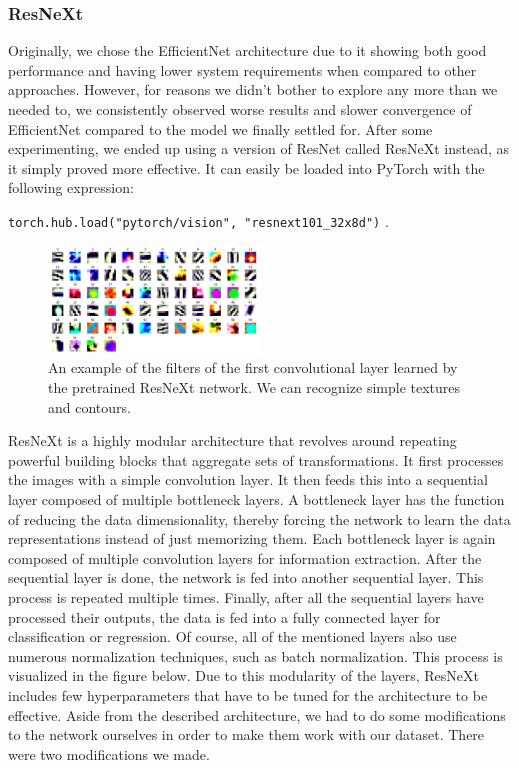 \documentclass[]{article}
\let\oldtexttt\texttt
\renewcommand{\texttt}[1]{
  \textcolor{tcolor}{\colorbox{bgcolor}{\oldtexttt{#1}}}
}
\begin{document}
\hypertarget{resnext}{%
\subsubsection{ResNeXt}\label{resnext}}

Originally, we chose the EfficientNet architecture due to it showing
both good performance and having lower system requirements when compared
to other approaches. However, for reasons we didn't bother to explore
any more than we needed to, we consistently observed worse results and
slower convergence of EfficientNet compared to the model we finally
settled for. After some experimenting, we ended up using a version of
ResNet called ResNeXt instead, as it simply proved more effective. It
can easily be loaded into PyTorch with the following expression:
\texttt{torch.hub.load("pytorch/vision",\ "resnext101\_32x8d")}.

\begin{figure}
\centering
\includegraphics[width=0.5\textwidth,height=\textheight]{./tex2pdf.-3ffa51a14b505aec/cc323be37658a6e24ac16ba06b6573198225f747.png}
\caption{An example of the filters of the first convolutional layer
learned by the pretrained ResNeXt network. We can recognize simple
textures and contours.}
\end{figure}

ResNeXt is a highly modular architecture that revolves around repeating
powerful building blocks that aggregate sets of transformations. It
first processes the images with a simple convolution layer. It then
feeds this into a sequential layer composed of multiple bottleneck
layers. A bottleneck layer has the function of reducing the data
dimensionality, thereby forcing the network to learn the data
representations instead of just memorizing them. Each bottleneck layer
is again composed of multiple convolution layers for information
extraction. After the sequential layer is done, the network is fed into
another sequential layer. This process is repeated multiple times.
Finally, after all the sequential layers have processed their outputs,
the data is fed into a fully connected layer for classification or
regression. Of course, all of the mentioned layers also use numerous
normalization techniques, such as batch normalization. This process is
visualized in the figure below. Due to this modularity of the layers,
ResNeXt includes few hyperparameters that have to be tuned for the
architecture to be effective. Aside from the described architecture, we
had to do some modifications to the network ourselves in order to make
them work with our dataset. There were two modifications we made.
\end{document}

